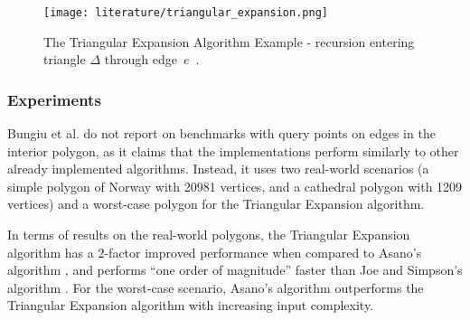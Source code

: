 \begin{figure}[h!]
	\centering
	\texttt{[image: literature/triangular\_expansion.png]}
	\caption{The Triangular Expansion Algorithm Example - recursion entering triangle $\Delta$ through edge~$e$~\cite{DBLP:journals/corr/BungiuHHHK14}.}
	\label{fig:triangular}
\end{figure}

\subsubsection{Experiments}
Bungiu et al. do not report on benchmarks with query points on edges in the interior polygon, as it claims that the implementations perform similarly to other already implemented algorithms. Instead, it uses two real-world scenarios (a simple polygon of Norway with 20981 vertices, and a cathedral polygon with 1209 vertices) and a worst-case polygon for the Triangular Expansion algorithm.

In terms of results on the real-world polygons, the Triangular Expansion algorithm has a 2-factor improved performance when compared to Asano's algorithm \cite{asano1985efficient}, and performs ``one order of magnitude'' faster than Joe and Simpson's algorithm \cite{joe1987corrections}. For the worst-case scenario, Asano's algorithm \cite{asano1985efficient} outperforms the Triangular Expansion algorithm with increasing input complexity.

